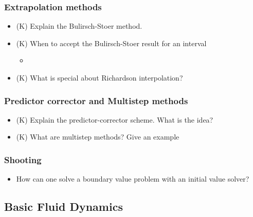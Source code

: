 \subsubsection*{Extrapolation methods}
\begin{itemize}
    \item (K) Explain the Bulirsch-Stoer method.
    \item (K) When to accept the Bulirsch-Stoer result for an interval
    \begin{itemize}
        \item {}
    \end{itemize}
    \item (K) What is special about Richardson interpolation?
\end{itemize}

\subsubsection*{Predictor corrector and Multistep methods}
\begin{itemize}
    \item (K) Explain the predictor-corrector scheme. What is the idea?
    \item (K) What are multistep methods? Give an example
\end{itemize}

\subsubsection*{Shooting}
\begin{itemize}
    \item How can one solve a boundary value problem with an initial value solver?
\end{itemize}

\subsection*{Basic Fluid Dynamics}

